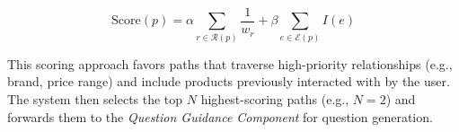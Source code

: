 \begin{equation}
\label{eq:score}
\mathrm{Score}(p) = \alpha \sum_{r \in \mathcal{R}(p)} \frac{1}{w_r} + \beta \sum_{e \in \mathcal{E}(p)} I(e)
\end{equation}







This scoring approach favors paths that traverse high-priority relationships (e.g., brand, price range) and include products previously interacted with by the user. The system then selects the top $N$ highest-scoring paths (e.g., $N = 2$) and forwards them to the \textit{Question Guidance Component} for question generation.

